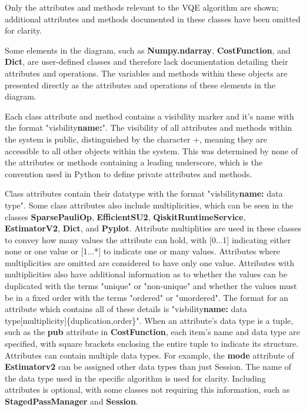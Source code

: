 \documentclass{article}
\begin{document}
Only the attributes and methods relevant to the VQE algorithm are shown; additional attributes and methods documented in these classes have been omitted for clarity.

Some elements in the diagram, such as \textbf{Numpy.ndarray}, \textbf{CostFunction}, and \textbf{Dict}, are user-defined classes and therefore lack documentation detailing their attributes and operations. The variables and methods within these objects are presented directly as the attributes and operations of these elements in the diagram.

Each class attribute and method contains a visibility marker and it's name with the format "visbility\textbf{name:}". The visibility of all attributes and methods within the system is public, distinguished by the character +, meaning they are accessible to all other objects within the system\cite{Seidl_Scholz_Huemer_Kappel_Duffy_2014}. This was determined by none of the attributes or methods containing a leading underscore, which is the convention used in Python to define private attributes and methods\cite{Privacy}.

Class attributes contain their datatype with the format "visbility\textbf{name:} data type". Some class attributes also include multiplicities, which can be seen in the classes \textbf{SparsePauliOp}, \textbf{EfficientSU2}, \textbf{QiskitRuntimeService}, \textbf{EstimatorV2}, \textbf{Dict}, and \textbf{Pyplot}. Attribute multiplities are used in these classes to convey how many values the attribute can hold\cite{Seidl_Scholz_Huemer_Kappel_Duffy_2014}, with [0...1] indicating either none or one value or [1...*] to indicate one or many values. Attributes where multiplicities are omitted are considered to have only one value. Attributes with multiplicities also have additional information as to whether the values can be duplicated with the terms "unique" or "non-unique" and whether the values must be in a fixed order with the terms "ordered" or "unordered"\cite{Seidl_Scholz_Huemer_Kappel_Duffy_2014}. The format for an attribute which contains all of these details is "visbility\textbf{name:} data type[multiplicity]\{duplication,order\}". When an attribute's data type is a tuple, such as the \textbf{pub} attribute in \textbf{CostFunction}, each item's name and data type are specified, with square brackets enclosing the entire tuple to indicate its structure. Attributes can contain multiple data types. For example, the \textbf{mode} attribute of \textbf{Estimatorv2} can be assigned other data types than just Session. The name of the data type used in the specific algorithm is used for clarity. Including attributes is optional, with some classes not requiring this information, such as \textbf{StagedPassManager} and \textbf{Session}. 
\end{document}
